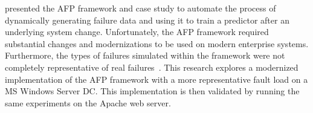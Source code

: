 \citet{irrera2015} presented the \ac{AFP} framework and case study to automate
the process of dynamically generating failure data and using it to train a
predictor after an underlying system change.  Unfortunately, the \ac{AFP}
framework required substantial changes and modernizations to be used on modern
enterprise systems.  Furthermore, the types of failures simulated within the
framework were not completely representative of real
failures~\citep{kikuchi2014}.  This research explores a modernized
implementation of the \ac{AFP} framework with a more representative fault load
on a \ac{MS} Windows Server \ac{DC}.  This implementation is then validated by
running the same experiments on the Apache web server.
